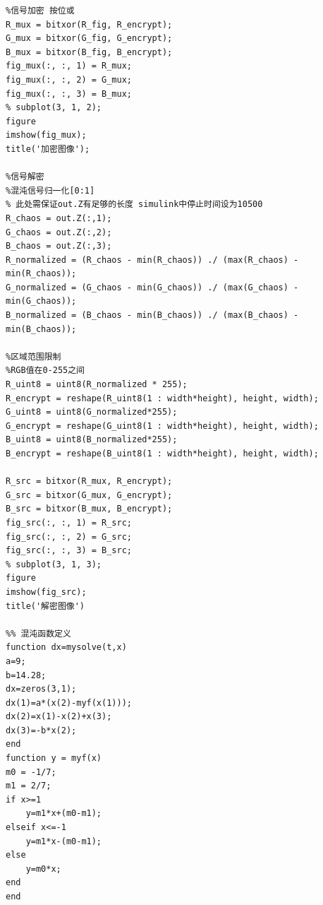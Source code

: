 \documentclass[UTF8]{article}
\begin{document}
\begin{lstlisting}
%信号加密 按位或
R_mux = bitxor(R_fig, R_encrypt);
G_mux = bitxor(G_fig, G_encrypt);
B_mux = bitxor(B_fig, B_encrypt);
fig_mux(:, :, 1) = R_mux;
fig_mux(:, :, 2) = G_mux;
fig_mux(:, :, 3) = B_mux;
% subplot(3, 1, 2);
figure
imshow(fig_mux);
title('加密图像');

%信号解密
%混沌信号归一化[0:1]
% 此处需保证out.Z有足够的长度 simulink中停止时间设为10500
R_chaos = out.Z(:,1);
G_chaos = out.Z(:,2);
B_chaos = out.Z(:,3);
R_normalized = (R_chaos - min(R_chaos)) ./ (max(R_chaos) - min(R_chaos));
G_normalized = (G_chaos - min(G_chaos)) ./ (max(G_chaos) - min(G_chaos));
B_normalized = (B_chaos - min(B_chaos)) ./ (max(B_chaos) - min(B_chaos));

%区域范围限制
%RGB值在0-255之间
R_uint8 = uint8(R_normalized * 255);
R_encrypt = reshape(R_uint8(1 : width*height), height, width);
G_uint8 = uint8(G_normalized*255);
G_encrypt = reshape(G_uint8(1 : width*height), height, width);
B_uint8 = uint8(B_normalized*255);
B_encrypt = reshape(B_uint8(1 : width*height), height, width);

R_src = bitxor(R_mux, R_encrypt);
G_src = bitxor(G_mux, G_encrypt);
B_src = bitxor(B_mux, B_encrypt);
fig_src(:, :, 1) = R_src;
fig_src(:, :, 2) = G_src;
fig_src(:, :, 3) = B_src;
% subplot(3, 1, 3);
figure
imshow(fig_src);
title('解密图像')

%% 混沌函数定义
function dx=mysolve(t,x)
a=9;
b=14.28;
dx=zeros(3,1);
dx(1)=a*(x(2)-myf(x(1)));
dx(2)=x(1)-x(2)+x(3);
dx(3)=-b*x(2);
end
function y = myf(x)
m0 = -1/7;
m1 = 2/7;
if x>=1
    y=m1*x+(m0-m1);
elseif x<=-1
    y=m1*x-(m0-m1);
else
    y=m0*x;
end
end
\end{lstlisting}
\end{document}
